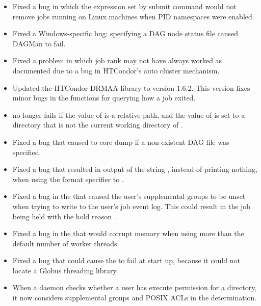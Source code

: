 \begin{itemize}
\item Fixed a bug in which the expression set by submit command 
 would not remove
jobs running on Linux machines when PID namespaces were enabled.

\item Fixed a Windows-specific bug:  specifying a DAG node status file
caused DAGMan to fail.

\item Fixed a problem in which job rank may not have always worked
as documented due to a bug in HTCondor's auto cluster mechanism.

\item Updated the HTCondor DRMAA library to version 1.6.2. 
This version fixes minor bugs in the functions for querying how a job exited.

\item {} no longer fails if the value of
 is a relative path, 
and the value of  is set to a directory 
that is not the current working directory of .

\item Fixed a bug that caused  to core dump if
a non-existent DAG file was specified.

\item Fixed a bug that resulted in output of the string , 
instead of printing nothing,
when using the  format specifier to
 .

\item Fixed a bug in the  that caused the user's supplemental
groups to be unset when trying to write to the user's job event log.
This could result in the job being held with the hold reason
.

\item Fixed a bug in the  that would corrupt memory when
using more than the default number of worker threads.

\item Fixed a bug that could cause the  to fail at
start up, because it could not locate a Globus threading library.

\item When a daemon checks whether a user has execute permission for a
directory, it now considers supplemental groups and POSIX ACLs in the
determination.


\end{itemize}
